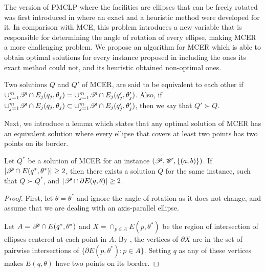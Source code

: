 The version of PMCLP where the facilities are ellipses that can be freely rotated was first introduced in \cite{andreta} where an exact and a heuristic method were developed for it. In comparison with MCE, this problem introduces a new variable that is responsible for determining the angle of rotation of every ellipse, making MCER a more challenging problem. We propose an algorithm for MCER which is able to obtain optimal solutions for every instance proposed in \cite{andreta} including the ones its exact method could not, and its heuristic obtained non-optimal ones.

\begin{definition}
	Two solutions $Q$ and $Q'$ of MCER, are said to be equivalent to each other if \mbox{$\cup_{j=1}^m \mathscr{P} \cap E_j(q_j, \theta_j) = \cup_{j=1}^m \mathscr{P} \cap E_j(q_j', \theta_j')$}. Also, if $\cup_{j=1}^m \mathscr{P} \cap E_j(q_j, \theta_j) \subset \cup_{j=1}^m \mathscr{P} \cap E_j(q_j', \theta_j')$, then we say that $Q' \succ Q$.
\end{definition}


Next, we introduce a lemma which states that any optimal solution of MCER has an equivalent solution where every ellipse that covers at least two points has two points on its border.

\begin{lem}\label{lema:mce_2b}
	Let $Q^*$ be a solution of MCER for an instance $(\mathscr{P}, \mathscr{W}, \{(a,b)\})$.
	If $|\mathscr{P} \cap E(q^*, \theta^*)| \ge 2$, then there exists a solution $Q$ for the same instance, such that $Q \succ Q^*$, and $|\mathscr{P} \cap \partial E(q, \theta)|\ge 2$.
\end{lem}

\begin{proof}
	First, let $\theta=\theta^*$ and ignore the angle of rotation as it does not change, and assume that we are dealing with an axis-parallel ellipse.
	
	Let $A=\mathscr{P} \cap E(q^*, \theta^*)$ and $X=\cap_{p \in A}E(p, \theta^*)$ be the region of intersection of ellipses centered at each point in $A$. By \cite{bi}, the vertices of $\partial X$ are in the set of pairwise intersections of $\{\partial E(p, \theta^*)\colon p \in A\}$. Setting $q$ as any of these vertices makes $E(q, \theta)$ have two points on its border.	
\end{proof}

